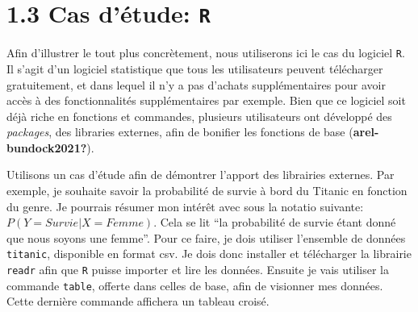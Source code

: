 \documentclass[
  letterpaper,
]{scrbook}
\newenvironment{Shaded}{\begin{snugshade}}{\end{snugshade}}
\newcommand{\FunctionTok}[1]{\textcolor[rgb]{0.28,0.35,0.67}{#1}}
\newcommand{\NormalTok}[1]{\textcolor[rgb]{0.00,0.23,0.31}{#1}}
\newcommand{\OtherTok}[1]{\textcolor[rgb]{0.00,0.23,0.31}{#1}}
\newcommand{\SpecialCharTok}[1]{\textcolor[rgb]{0.37,0.37,0.37}{#1}}
\newcommand{\StringTok}[1]{\textcolor[rgb]{0.13,0.47,0.30}{#1}}
\newcommand*\circled[1]{\tikz[baseline=(char.base)]{
          \node[shape=circle,draw,inner sep=1pt] (char) {{\scriptsize#1}};}}
\begin{document}
\hypertarget{cas-duxe9tude-r}{%
\section{\texorpdfstring{1.3 Cas d'étude:
\texttt{R}}{1.3 Cas d'étude: R}}\label{cas-duxe9tude-r}}

Afin d'illustrer le tout plus concrètement, nous utiliserons ici le cas
du logiciel \texttt{R}. Il s'agit d'un logiciel statistique que tous les
utilisateurs peuvent télécharger gratuitement, et dans lequel il n'y a
pas d'achats supplémentaires pour avoir accès à des fonctionnalités
supplémentaires par exemple. Bien que ce logiciel soit déjà riche en
fonctions et commandes, plusieurs utilisateurs ont développé des
\emph{packages}, des libraries externes, afin de bonifier les fonctions
de base (\textbf{arel-bundock2021?}).

Utilisons un cas d'étude afin de démontrer l'apport des librairies
externes. Par exemple, je souhaite savoir la probabilité de survie à
bord du Titanic en fonction du genre. Je pourrais résumer mon intérêt
avec sous la notatio suivante: \(P(Y = Survie | X = Femme)\). Cela se
lit ``la probabilité de survie étant donné que nous soyons une femme''.
Pour ce faire, je dois utiliser l'ensemble de données \texttt{titanic},
disponible en format csv. Je dois donc installer et télécharger la
librairie \texttt{readr} afin que \texttt{R} puisse importer et lire les
données. Ensuite je vais utiliser la commande \texttt{table}, offerte
dans celles de base, afin de visionner mes données. Cette dernière
commande affichera un tableau croisé.

\hypertarget{annotated-cell-1}{%
\label{annotated-cell-1}}%
\begin{Shaded}
\end{Shaded}
\end{document}
